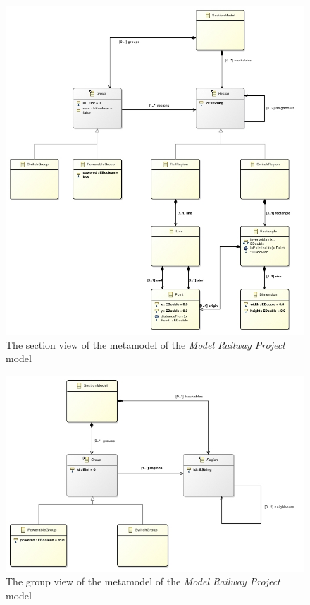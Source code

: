 \begin{figure}[h]
	\centering
	\includegraphics[width=\linewidth]{include/figures/chapter_6/metamodels/sectionmodel}
	\caption{The section view of the metamodel of the \emph{Model Railway Project} model} 
	\label{fig:case_study:sectionmodel}
\end{figure}
\begin{figure}[h]
	\centering
	\includegraphics[width=\linewidth]{include/figures/chapter_6/metamodels/groupmodel}
	\caption{The group view of the metamodel of the \emph{Model Railway Project} model} 
	\label{fig:case_study:groupmodel}
\end{figure}
